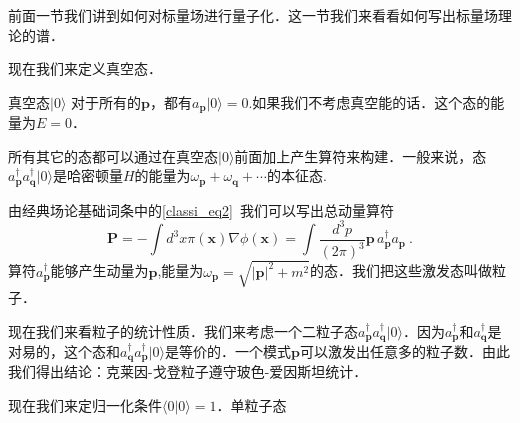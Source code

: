 
前面一节我们讲到如何对标量场进行量子化．这一节我们来看看如何写出标量场理论的谱．

现在我们来定义真空态．
\begin{definition}{真空态$|0\rangle$}
对于所有的$\mathbf p$，都有$a_{\mathbf p}|0\rangle=0$.如果我们不考虑真空能的话．这个态的能量为$E=0$．
\end{definition}
所有其它的态都可以通过在真空态$|0\rangle$前面加上产生算符来构建．一般来说，态$a^\dagger_{\mathbf p}a^\dagger_{\mathbf q}|0\rangle$是哈密顿量$H$的能量为$\omega_{\mathbf p}+\omega_{\mathbf q}+\cdots$的本征态.

由经典场论基础词条中的\autoref{classi_eq2}~我们可以写出总动量算符
\begin{equation}
\mathbf P = -\int d^3 x \pi(\mathbf x) \nabla \phi(\mathbf x) = \int \frac{d^3p}{(2\pi)^3} \mathbf p\, a^\dagger_{\mathbf p} a_{\mathbf p}~. 
\end{equation}
算符$a_{\mathbf p}^\dagger$能够产生动量为$\mathbf p$,能量为$\omega_{\mathbf p} = \sqrt{|\mathbf p|^2+m^2}$的态．我们把这些激发态叫做粒子．

现在我们来看粒子的统计性质．我们来考虑一个二粒子态$a^\dagger_{\mathbf p}a^\dagger_{\mathbf q}| 0 \rangle$．因为$a^\dagger_{\mathbf p}$和$a^\dagger_{\mathbf q}$是对易的，这个态和$a^\dagger_{\mathbf q}a^\dagger_{\mathbf p}| 0 \rangle$是等价的．一个模式$\mathbf p$可以激发出任意多的粒子数．由此我们得出结论：克莱因-戈登粒子遵守玻色-爱因斯坦统计．

现在我们来定归一化条件$\langle 0 | 0 \rangle = 1$．单粒子态$$



